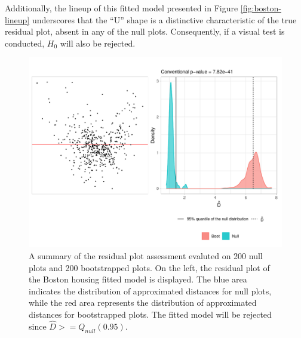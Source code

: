 \documentclass[]{interact}
\theoremstyle{plain}%
\theoremstyle{definition}
\theoremstyle{remark}
\begin{document}
Additionally, the lineup of this fitted model presented in Figure
\ref{fig:boston-lineup} underscores that the ``U'' shape is a
distinctive characteristic of the true residual plot, absent in any of
the null plots. Consequently, if a visual test is conducted, \(H_0\)
will also be rejected.

\begin{figure}[!h]

{\centering \includegraphics[width=1\linewidth]{paper_files/figure-latex/boston-check-1} 

}

\caption{A summary of the residual plot assessment evaluted on 200 null plots and 200 bootstrapped plots. On the left, the residual plot of the Boston housing fitted model is displayed. The blue area indicates the distribution of approximated distances for null plots, while the red area represents the distribution of approximated distances for bootstrapped plots. The fitted model will be rejected since $\hat{D} >= Q_{null}(0.95)$.}\label{fig:boston-check}
\end{figure}
\end{document}

